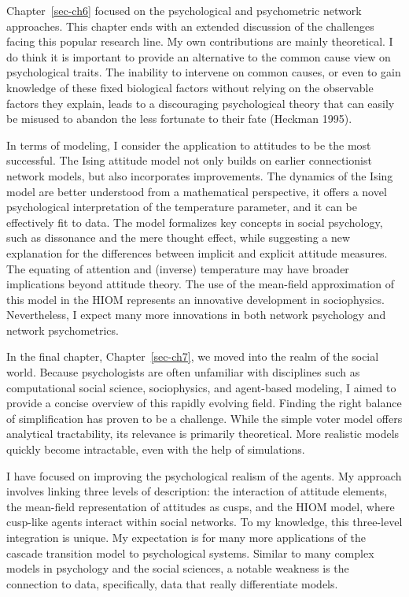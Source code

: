 \documentclass[
  a4paper,
  DIV=11,
  numbers=noendperiod,
  oneside]{scrreprt}
\begin{document}
Chapter~\ref{sec-ch6} focused on the psychological and psychometric
network approaches. This chapter ends with an extended discussion of the
challenges facing this popular research line. My own contributions are
mainly theoretical. I do think it is important to provide an alternative
to the common cause view on psychological traits. The inability to
intervene on common causes, or even to gain knowledge of these fixed
biological factors without relying on the observable factors they
explain, leads to a discouraging psychological theory that can easily be
misused to abandon the less fortunate to their fate (Heckman 1995).

In terms of modeling, I consider the application to attitudes to be the
most successful. The Ising attitude model not only builds on earlier
connectionist network models, but also incorporates improvements. The
dynamics of the Ising model are better understood from a mathematical
perspective, it offers a novel psychological interpretation of the
temperature parameter, and it can be effectively fit to data. The model
formalizes key concepts in social psychology, such as dissonance and the
mere thought effect, while suggesting a new explanation for the
differences between implicit and explicit attitude measures. The
equating of attention and (inverse) temperature may have broader
implications beyond attitude theory. The use of the mean-field
approximation of this model in the HIOM represents an innovative
development in sociophysics. Nevertheless, I expect many more
innovations in both network psychology and network psychometrics.

In the final chapter, Chapter~\ref{sec-ch7}, we moved into the realm of
the social world. Because psychologists are often unfamiliar with
disciplines such as computational social science, sociophysics, and
agent-based modeling, I aimed to provide a concise overview of this
rapidly evolving field. Finding the right balance of simplification has
proven to be a challenge. While the simple voter model offers analytical
tractability, its relevance is primarily theoretical. More realistic
models quickly become intractable, even with the help of simulations.

I have focused on improving the psychological realism of the agents. My
approach involves linking three levels of description: the interaction
of attitude elements, the mean-field representation of attitudes as
cusps, and the HIOM model, where cusp-like agents interact within social
networks. To my knowledge, this three-level integration is unique. My
expectation is for many more applications of the cascade transition
model to psychological systems. Similar to many complex models in
psychology and the social sciences, a notable weakness is the connection
to data, specifically, data that really differentiate models.
\end{document}
